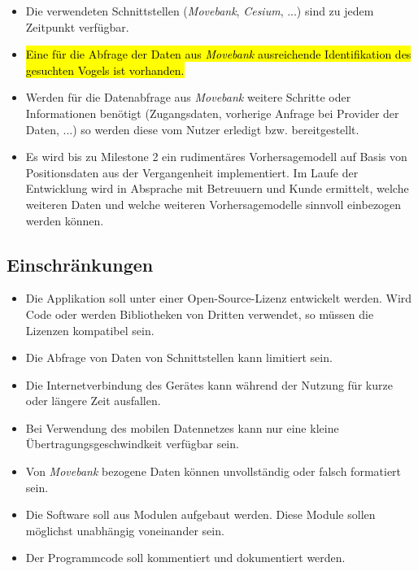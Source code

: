 \documentclass[12pt]{article} %
\begin{document}
\begin{itemize} 
 	 \item Die verwendeten Schnittstellen (\textit{Movebank}, \textit{Cesium}, ...) sind zu jedem Zeitpunkt verfügbar.
 	 \item \hl{Eine für die Abfrage der Daten aus \textit{Movebank} ausreichende Identifikation des gesuchten Vogels ist vorhanden. }
 	 \item Werden für die Datenabfrage aus \textit{Movebank} weitere Schritte oder Informationen benötigt (Zugangsdaten, vorherige Anfrage bei Provider der Daten, ...) so werden diese vom Nutzer erledigt bzw. bereitgestellt.
 	 \item Es wird bis zu Milestone 2 ein rudimentäres Vorhersagemodell auf Basis von Positionsdaten aus der Vergangenheit implementiert. Im Laufe der Entwicklung wird in Absprache mit Betreuuern und Kunde ermittelt, welche weiteren Daten und welche weiteren Vorhersagemodelle sinnvoll einbezogen werden können.
\end{itemize} 


\subsection{Einschränkungen}

\begin{itemize} 
	\item Die Applikation soll unter einer Open-Source-Lizenz entwickelt werden. Wird Code oder werden Bibliotheken von Dritten verwendet, so müssen die Lizenzen kompatibel sein.
	\item Die Abfrage von Daten von Schnittstellen kann limitiert sein.
	\item Die Internetverbindung des Gerätes kann während der Nutzung für kurze oder längere Zeit ausfallen.
	\item Bei Verwendung des mobilen Datennetzes kann nur eine kleine Übertragungsgeschwindkeit verfügbar sein.
	\item Von \textit{Movebank} bezogene Daten können unvollständig oder falsch formatiert sein.
	\item Die Software soll aus Modulen aufgebaut werden. Diese Module sollen möglichst unabhängig voneinander sein.
	\item Der Programmcode soll kommentiert und dokumentiert werden.
\end{itemize} 
\end{document}
